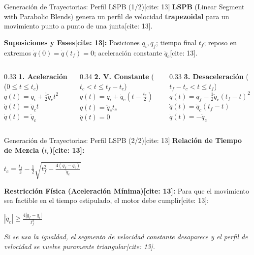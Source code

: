 \documentclass[aspectratio=169, xcolor={table,xcdraw}]{beamer}
\begin{document}
\begin{frame}{Generación de Trayectorias: Perfil LSPB (1/2)[cite: 13]}
    \small 
    \textbf{LSPB} (Linear Segment with Parabolic Blends) genera un perfil de velocidad \textbf{trapezoidal} para un movimiento punto a punto de una junta[cite: 13].
    
    \textbf{Suposiciones y Fases[cite: 13]:} Posiciones $q_i, q_f$; tiempo final $t_f$; reposo en extremos $\dot{q}(0)=\dot{q}(t_f)=0$; aceleración constante $\ddot{q}_c$[cite: 13].
    
    \vspace{0.4cm}
    \begin{columns}[T]
        \begin{column}{0.33\textwidth}
            \footnotesize
            \textbf{1. Aceleración} ($0 \le t \le t_c$)\\
            $q(t) = q_i + \tfrac{1}{2}\ddot{q}_c t^2$ \\
            $\dot{q}(t) = \ddot{q}_c t$ \\
            $\ddot{q}(t) = \ddot{q}_c$
        \end{column}
        \begin{column}{0.34\textwidth}
            \footnotesize
            \textbf{2. V. Constante} ($t_c < t \le t_f - t_c$)\\
            $q(t) = q_i + \dot{q}_c (t - \tfrac{t_c}{2})$ \\
            $\dot{q}(t) = \ddot{q}_c t_c$ \\
            $\ddot{q}(t) = 0$
        \end{column}
        \begin{column}{0.33\textwidth}
            \footnotesize
            \textbf{3. Desaceleración} ($t_f - t_c < t \le t_f$)\\
            $q(t) = q_f - \tfrac{1}{2}\ddot{q}_c(t_f - t)^2$ \\
            $\dot{q}(t) = \ddot{q}_c(t_f - t)$ \\
            $\ddot{q}(t) = -\ddot{q}_c$
        \end{column}
    \end{columns}
\end{frame}

\begin{frame}{Generación de Trayectorias: Perfil LSPB (2/2)[cite: 13]}
    \textbf{Relación de Tiempo de Mezcla ($t_c$)[cite: 13]:}
    \begin{center}
        $\boxed{ t_c = \frac{t_f}{2} - \frac{1}{2}\sqrt{t_f^2 - \frac{4(q_f - q_i)}{\ddot{q}_c}} }$ \text{[cite: 13]}
    \end{center}
    
    \vfill
    \textbf{Restricción Física (Aceleración Mínima)[cite: 13]:}
    Para que el movimiento sea factible en el tiempo estipulado, el motor debe cumplir[cite: 13]:
    \begin{center}
        $\boxed{ |\ddot{q}_c| \ge \frac{4|q_f - q_i|}{t_f^2} }$ \text{[cite: 13]}
    \end{center}
    \vfill
    \textit{Si se usa la igualdad, el segmento de velocidad constante desaparece y el perfil de velocidad se vuelve puramente triangular[cite: 13].}
\end{frame}
\end{document}
